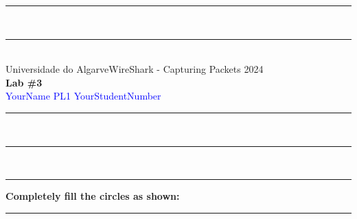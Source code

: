 \documentclass{article}
\begin{document}
\begin{center}
\rule{\textwidth}{.0075in} \\
\rule[3mm]{\textwidth}{.0075in}\\

Universidade do Algarve\hfill WireShark - Capturing Packets \hfill 2024\\[3ex]

{\Large\bf Lab \#3} \\[3ex]

 \textcolor{blue}{YourName} \hfill  
 \textcolor{blue}{PL1} \hfill
 \textcolor{blue}{YourStudentNumber}\\

\rule{\textwidth}{.0075in} \\
\rule[3mm]{\textwidth}{.0075in} \\
\end{center}



\begin{center}
\rule{\textwidth}{0.4pt}
\textbf{Completely fill the circles as shown: \Circle \Circle \CIRCLE \Circle}
\rule{\textwidth}{0.4pt}
\end{center}
\end{document}
